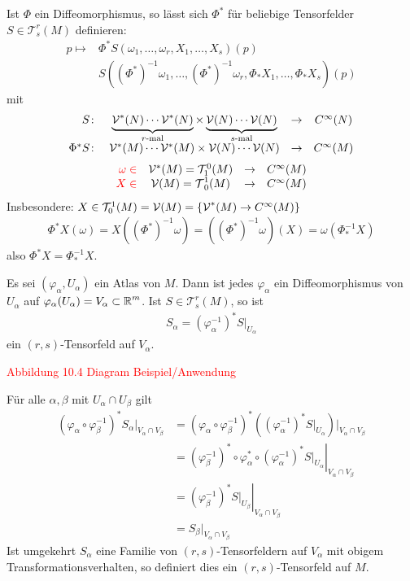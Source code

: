 Ist $\Phi$ ein Diffeomorphismus, so lässt sich $\Phi^{*}$ für beliebige Tensorfelder $S \in \mathcal T_s^r(M)$ definieren:
	\[ \begin{array}{rl} p \mapsto& \Phi^{*}S (\omega_1,\ldots,\omega_r,X_1,\ldots,X_s)(p)\\
		& S((\Phi^{*})^{-1}\omega_1, \ldots, (\Phi^{*})^{-1}\omega_{r}, \Phi_{*}X_1,\ldots,\Phi_{*}X_s)(p) \end{array} \]
mit
	\[ \begin{array}{rccc} S \colon& \underbrace{\mathcal V^{*}(N) \cdots \mathcal V^{*}(N)}_{r\text{-mal}} \times \underbrace{ \mathcal V(N) \cdots\mathcal V(N)}_{s\text{-mal}} &\to& C^{\infty}(N)\\
		\Phi^*S \colon& \mathcal V^{*}(M) \cdots \mathcal V^{*}(M) \times \mathcal V(N) \cdots\mathcal V(N) &\to& C^{\infty}(M) \end{array} \]
	\[ \begin{array}{rccc} \textcolor{red}{\omega \in}& \mathcal V^{*}(M) = \mathcal T_1^0(M) &\to& C^{\infty}(M)\\
		\textcolor{red}{X \in}& \mathcal V(M) = \operatorname{\mathcal{T}}_0^1(M) &\to& C^{\infty}(M) \end{array} \]
Insbesondere: $X \in \mathcal T_0^1(M) = \mathcal V(M) = \{\operatorname{\mathcal{V}}^*(M) \to C^{\infty}(M)\}$
\begin{align*}
  \Phi^{*}X(\omega) = X((\Phi^{*})^{-1}\omega) = ((\Phi^{*})^{-1}\omega)(X) = \omega(\Phi_{*}^{-1}X)
\end{align*}
also $\Phi^{*}X = \Phi_{*}^{-1}X$.

\begin{bsp}[Anwendung]
  Es sei $(\varphi_{\alpha},U_{\alpha})$ ein Atlas von $M$. Dann ist jedes $\varphi_{\alpha}$ ein Diffeomorphismus von $U_{\alpha}$ auf $\varphi_{\alpha}(U_{\alpha}) = V_{\alpha} \subset \operatorname{\mathbb{R}}^m$. Ist $S \in \mathcal T_s^r(M)$, so ist
  \begin{align*}
    S_{\alpha} = (\varphi_{\alpha}^{-1})^{*}S|_{U_\alpha}
  \end{align*}
  ein $(r,s)$-Tensorfeld auf $V_{\alpha}$.

  \textcolor{red}{Abbildung 10.4 Diagram Beispiel/Anwendung}

  Für alle $\alpha, \beta$ mit $U_{\alpha} \cap U_{\beta}$ gilt
  \begin{align*}
    (\varphi_{\alpha} \circ \varphi_{\beta}^{-1})^{*}S_{\alpha}|_{V_{\alpha} \cap V_{\beta}} & = (\varphi_{\alpha} \circ \varphi_{\beta}^{-1})^{*}\left((\varphi_{\alpha}^{-1})^{*}S|_{U_{\alpha}}\right)|_{V_{\alpha}\cap V_{\beta}}\\
    & = \left.(\varphi_{\beta}^{-1})^{*} \circ \varphi_{\alpha}^{*} \circ (\varphi_{\alpha}^{-1})^{*} S|_{U_{\alpha}}\right|_{V_{\alpha} \cap V_{\beta}}\\
    & = \left.(\varphi_{\beta}^{-1})^{*}S|_{U_{\beta}}\right|_{V_{\alpha} \cap V_{\beta}}\\
    & = S_{\beta}|_{V_{\alpha} \cap V_{\beta}}
  \end{align*}
  Ist umgekehrt $S_\alpha$ eine Familie von $(r,s)$-Tensorfeldern auf $V_{\alpha}$ mit obigem Transformationsverhalten, so definiert dies ein $(r,s)$-Tensorfeld auf $M$.
\end{bsp}

